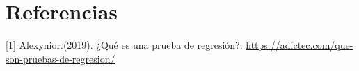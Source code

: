 \documentclass[conference]{IEEEtran}
\begin{document}
\section{Referencias}


[1] Alexynior.(2019). ¿Qué es una prueba de regresión?.       \url{https://adictec.com/que-son-pruebas-de-regresion/}
\\
%
%
\end{document}
